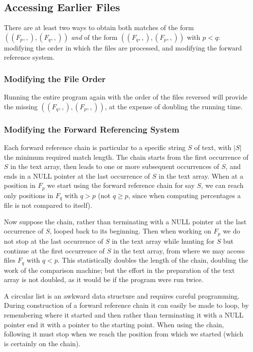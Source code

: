 \documentclass[a4paper,fleqn]{article}
\begin{document}
\subsection{Accessing Earlier Files}

There are at least two ways to obtain both matches of the form
$((F_p,,),(F_q,,))$ \emph{and} of the form $((F_q,,),(F_p,,))$ with $p < q$:
modifying the order in which the files are processed, and modifying the
forward reference system.

\subsubsection{Modifying the File Order}

Running the entire program again with the order of the files reversed will
provide the missing $((F_q,,),(F_p,,))$, at the expense of doubling the
running time.

\subsubsection{Modifying the Forward Referencing System}

Each forward reference chain is particular to a specific string $S$ of text,
with $|S|$ the minimum required match length.
The chain starts from the first occurrence of $S$ in the text array, then
leads to one or more subsequent occurrences of $S$, and ends in a NULL pointer
at the last occurrence of $S$ in the text array.
When at a position in $F_p$ we start using the forward reference chain for say
$S$, we can reach only positions in $F_q$ with $q > p$ (not $ q \ge p$,
since when computing percentages a file is not compared to itself).

Now suppose the chain, rather than terminating with a NULL pointer at the last
occurrence of $S$, looped back to its beginning.
Then when working on $F_p$ we do not stop at the last occurrence of $S$ in the
text array while hunting for $S$
but continue at the first occurrence of $S$ in the text array, from where we
may access files $F_q$ with $ q < p $.
This statistically doubles the length of the chain, doubling the work of the
comparison machine; but the effort in the preparation of the text array is not
doubled, as it would be if the program were run twice.

A circular list is an awkward data structure and requires careful programming.
During construction of a forward reference chain it can easily be made to loop,
by remembering where it started and then rather than terminating it with a NULL
pointer end it with a pointer to the starting point.
When using the chain, following it must stop when we reach the position from
which we started (which is certainly on the chain).
\end{document}
